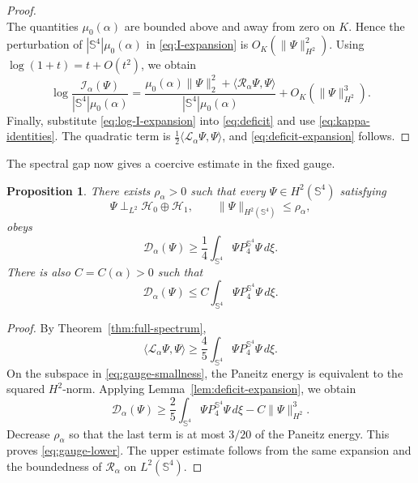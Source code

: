 \documentclass[11pt]{article}
\newtheorem{proposition}[theorem]{Proposition}
\numberwithin{equation}{section}
\begin{document}
\begin{proof}
\begin{equation*}
\end{equation*}
The quantities \(\mu_0(\alpha)\) are bounded above and away from zero on
\(K\). Hence the perturbation of
\(|\mathbb S^{4}|\mu_0(\alpha)\) in \eqref{eq:I-expansion} is
\(O_K(\|\Psi\|_{H^{2}}^{2})\). Using
\(\log(1+t)=t+O(t^{2})\), we obtain
\begin{equation}\label{eq:log-I-expansion}
\log\frac{\mathcal I_{\alpha}(\Psi)}
{|\mathbb S^{4}|\mu_{0}(\alpha)}
=
\frac{\mu_{0}(\alpha)\|\Psi\|_{2}^{2}
+\langle\mathcal R_{\alpha}\Psi,\Psi\rangle}
{|\mathbb S^{4}|\mu_{0}(\alpha)}
+O_K(\|\Psi\|_{H^{2}}^{3}).
\end{equation}
Finally, substitute \eqref{eq:log-I-expansion} into \eqref{eq:deficit} and use
\eqref{eq:kappa-identities}. The quadratic term is
\(\frac12\langle\mathcal L_{\alpha}\Psi,\Psi\rangle\), and
\eqref{eq:deficit-expansion} follows.
\end{proof}

The spectral gap now gives a coercive estimate in the fixed gauge.

\begin{proposition}\label{prop:gauge-fixed}
There exists \(\rho_{\alpha}>0\) such that every \(\Psi\in H^{2}(\mathbb S^{4})\) satisfying
\begin{equation}\label{eq:gauge-smallness}
\Psi\perp_{L^{2}}\mathcal H_{0}\oplus\mathcal H_{1},
\qquad
\|\Psi\|_{H^{2}(\mathbb S^{4})}\leq\rho_{\alpha},
\end{equation}
obeys
\begin{equation}\label{eq:gauge-lower}
\mathcal D_{\alpha}(\Psi)
\geq\frac14\int_{\mathbb S^{4}}\Psi P_{4}^{\mathbb S^{4}}\Psi\,d\xi.
\end{equation}
There is also \(C=C(\alpha)>0\) such that
\begin{equation*}
\mathcal D_{\alpha}(\Psi)
\leq C\int_{\mathbb S^{4}}\Psi P_{4}^{\mathbb S^{4}}\Psi\,d\xi.
\end{equation*}
\end{proposition}

\begin{proof}
By Theorem~\ref{thm:full-spectrum},
\begin{equation*}
\langle\mathcal L_{\alpha}\Psi,\Psi\rangle
\geq\frac45\int_{\mathbb S^{4}}\Psi P_{4}^{\mathbb S^{4}}\Psi\,d\xi.
\end{equation*}
On the subspace in \eqref{eq:gauge-smallness}, the Paneitz energy is
equivalent to the squared \(H^{2}\)-norm. Applying
Lemma~\ref{lem:deficit-expansion}, we obtain
\[
\mathcal D_{\alpha}(\Psi)
\geq\frac25\int_{\mathbb S^{4}}\Psi P_{4}^{\mathbb S^{4}}\Psi\,d\xi
-C\|\Psi\|_{H^{2}}^{3}.
\]
Decrease \(\rho_{\alpha}\) so that the last term is at most \(3/20\) of the Paneitz energy. This proves \eqref{eq:gauge-lower}. The upper estimate follows from the same expansion and the boundedness of \(\mathcal R_{\alpha}\) on \(L^{2}(\mathbb S^{4})\).
\end{proof}
\end{document}
